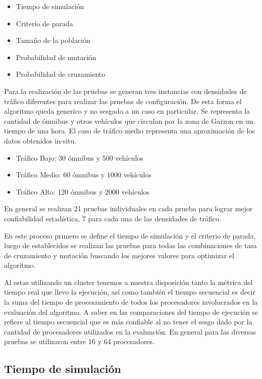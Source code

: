 \begin{itemize}
	\item Tiempo de simulación	
	\item Criterio de parada
	\item Tamaño de la población
	\item Probabilidad de mutación
	\item Probabilidad de cruzamiento
\end{itemize}

Para la realización de las pruebas se generan tres instancias con densidades de tráfico diferentes para realizar las pruebas de configuración. De esta forma el algoritmo queda generico y no sesgado a un caso en particular. Se representa la cantidad de ómnibus y otros vehículos que circulan por la zona de Garzon en un tiempo de una hora. El caso de tráfico medio representa una aproximación de los datos obtenidos in-situ.

\begin{itemize}
	\item Tráfico Bajo: 30 ómnibus y 500 vehículos	
	\item Tráfico Medio: 60 ómnibus y 1000 vehículos
	\item Tráfico Alto: 120 ómnibus y 2000 vehículos
\end{itemize}

En general se realizan 21 pruebas individuales en cada prueba para lograr mejor confiabilidad estadística, 7 para cada una de las densidades de tráfico.

En este proceso primero se define el tiempo de simulación y el criterio de parada, luego de establecidos se realizan las pruebas para todas las combinaciones de tasa de cruzamiento y mutación buscando los mejores valores para optimizar el algoritmo.


Al estas utilizando un cluster tenemos a nuestra disposición tanto la métrica del tiempo real que llevo la ejecución, así como también el tiempo secuencial es decir la suma del tiempo de procesamiento de todos los procesadores involucrados en la evaluación del algoritmo. 
A saber en las comparaciones del tiempo de ejecución se refiere al tiempo secuencial que es más confiable al no tener el sesgo dado por la cantidad de procesadores utilizados en la evaluación.
En general para las diversas pruebas se utilizaron entre 16 y 64 procesadores.




\subsection{Tiempo de simulación}

